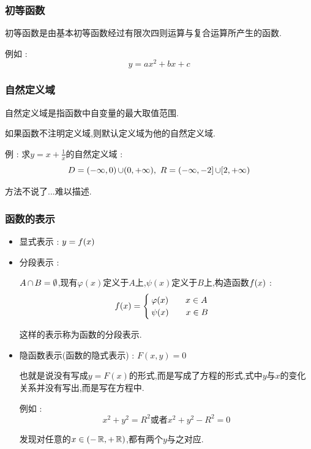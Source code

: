 {{{\subsubsection{初等函数}{
    初等函数是由基本初等函数经过有限次四则运算与复合运算所产生的函数.

    例如 : $$
        y = ax^2 + bx + c
    $$
}%

\subsubsection{自然定义域}{
自然定义域是指函数中自变量的最大取值范围.

如果函数不注明定义域,则默认定义域为他的自然定义域.

例 : 求$y = x + \frac{1}{x}$的自然定义域 : $$
    D = (-\infty,0) \operatorname{\cup} (0,+\infty),\ R = (-\infty,-2] \operatorname{\cup} [2,+\infty)
$$

方法不说了...难以描述.
}%

\subsubsection{函数的表示}{
    \begin{itemize}
        \item 显式表示 : $y = f(x)$
        \item {
              分段表示 :

              $A \operatorname{\cap} B = \emptyset$,现有$\varphi(x)$定义于$A$上,$\psi(x)$定义于$B$上,构造函数$f(x)$ : $$
                  f(x) = \begin{cases}
                      \varphi(x)\qquad x \in A \\
                      \psi(x)\qquad x \in B
                  \end{cases}
              $$

              这样的表示称为函数的分段表示.
              }
        \item {
              隐函数表示(函数的隐式表示) : $F(x,y) = 0$

              也就是说没有写成$y = F(x)$的形式,而是写成了方程的形式,式中$y$与$x$的变化关系并没有写出,而是写在方程中.

              例如 : $$
                  x^2 + y^2 = R^2\mbox{或者}x^2 + y^2 - R^2 = 0
              $$

              发现对任意的$x \in (-\operatorname{\mathbb{R}},+\operatorname{\mathbb{R}})$,都有两个$y$与之对应.

}
\end{itemize}}}}}
